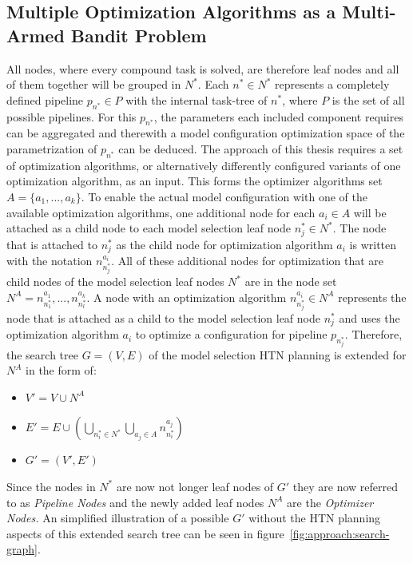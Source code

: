 \subsection{Multiple Optimization Algorithms as a Multi-Armed Bandit Problem}
\label{sec:approach:selection:bandit}
All nodes, where every compound task is solved, are therefore leaf nodes and all of them together will be grouped in $N^*$.
Each $n^* \in N^*$ represents a completely defined pipeline $p_{n^*} \in P$ with the internal task-tree of $n^*$, where $P$ is the set of all possible pipelines.
For this $p_{n^*}$, the parameters each included component requires can be aggregated and therewith a model configuration optimization space of the parametrization of $p_{n^*}$ can be deduced.\newline
The approach of this thesis requires a set of optimization algorithms, or alternatively differently configured variants of one optimization algorithm, as an input.
This forms the optimizer algorithms set  $A = \{ a_1, ..., a_k \}$.
To enable the actual model configuration with one of the available optimization algorithms, one additional node for each $a_i \in A$ will be attached as a child node to each model selection leaf node $n^*_j \in N^*$.
The node that is attached to $n^*_j$ as the child node for optimization algorithm $a_i$ is written with the notation $n_{n^*_j}^{a_i}$.
All of these additional nodes for optimization that are child nodes of the model selection leaf nodes $N^*$ are in the node set $N^A = {n^{a_1}_{n^*_1}, ... , n^{a_k}_{n^*_l}}$.
A node with an optimization algorithm $n^{a_i}_{n^*_j} \in N^A$ represents the node that is attached as a child to the model selection leaf node $n^*_j$ and uses the optimization algorithm $a_i$ to optimize a configuration for pipeline $p_{n^*_j}$.\newline
Therefore, the search tree $G=(V, E)$ of the model selection HTN planning is extended for $N^A$ in the form of:
\begin{itemize}
    \item $V'=V \cup N^A$
    \item $E'=E \cup \left( \bigcup_{n^*_i \in N^*} \bigcup_{a_j \in A} n^{a_j}_{n^*_i} \right)$
    \item $G' = (V', E')$
\end{itemize}
Since the nodes in $N^*$ are now not longer leaf nodes of $G'$ they are now referred to as \textit{Pipeline Nodes} and the newly added leaf nodes $N^A$ are the \textit{Optimizer Nodes.}
An simplified illustration of a possible $G'$ without the HTN planning aspects of this extended search tree can be seen in figure~\ref{fig:approach:search-graph}.
